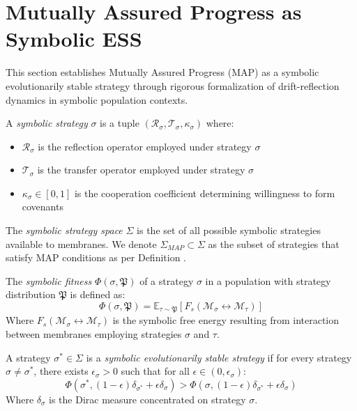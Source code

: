 \section{Mutually Assured Progress as Symbolic ESS}
\label{sec:bk5_mutually_assured_progress_as_symbolic_ess}
This section establishes Mutually Assured Progress (MAP) as a symbolic evolutionarily stable strategy through rigorous formalization of drift-reflection dynamics in symbolic population contexts.
\begin{definition}
\label{definition:bk5_symbolic_strategy}
A \emph{symbolic strategy} $\sigma$ is a tuple $(\mathcal{R}_\sigma, \mathcal{T}_\sigma, \kappa_\sigma)$ where:
\begin{itemize}
    \item $\mathcal{R}_\sigma$ is the reflection operator employed under strategy $\sigma$
    \item $\mathcal{T}_\sigma$ is the transfer operator employed under strategy $\sigma$
    \item $\kappa_\sigma \in [0,1]$ is the cooperation coefficient determining willingness to form covenants
\end{itemize}
\end{definition}
\begin{definition}
\label{definition:bk5_strategy_space}
The \emph{symbolic strategy space} $\Sigma$ is the set of all possible symbolic strategies available to membranes. We denote $\Sigma_{MAP} \subset \Sigma$ as the subset of strategies that satisfy MAP conditions as per Definition .
\end{definition}
\begin{definition}
\label{definition:bk5_symbolic_fitness}
The \emph{symbolic fitness} $\Phi(\sigma, \mathfrak{P})$ of a strategy $\sigma$ in a population with strategy distribution $\mathfrak{P}$ is defined as:
\begin{equation}
\Phi(\sigma, \mathfrak{P}) = \mathbb{E}_{\tau \sim \mathfrak{P}}[F_s(\mathscr{M}_\sigma \leftrightarrow \mathscr{M}_\tau)]
\end{equation}
Where $F_s(\mathscr{M}_\sigma \leftrightarrow \mathscr{M}_\tau)$ is the symbolic free energy resulting from interaction between membranes employing strategies $\sigma$ and $\tau$.
\end{definition}
\begin{definition}
\label{definition:bk5_symbolic_ess}
A strategy $\sigma^* \in \Sigma$ is a \emph{symbolic evolutionarily stable strategy} if for every strategy $\sigma \neq \sigma^*$, there exists $\epsilon_\sigma > 0$ such that for all $\epsilon \in (0, \epsilon_\sigma)$:
\begin{equation}
\Phi(\sigma^*, (1-\epsilon)\delta_{\sigma^*} + \epsilon\delta_\sigma) > \Phi(\sigma, (1-\epsilon)\delta_{\sigma^*} + \epsilon\delta_\sigma)
\end{equation}
Where $\delta_\sigma$ is the Dirac measure concentrated on strategy $\sigma$.
\end{definition}
